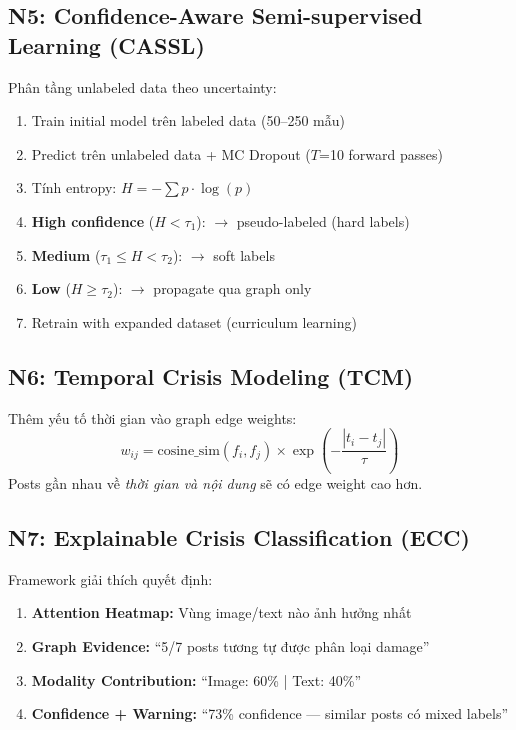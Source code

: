 \documentclass[12pt,a4paper]{article}
\begin{document}
\subsection{N5: Confidence-Aware Semi-supervised Learning (CASSL)}

Phân tầng unlabeled data theo uncertainty:
\begin{enumerate}
  \item Train initial model trên labeled data (50--250 mẫu)
  \item Predict trên unlabeled data + MC Dropout ($T$=10 forward passes)
  \item Tính entropy: $H = -\sum p \cdot \log(p)$
  \item \textbf{High confidence} ($H < \tau_1$): $\rightarrow$ pseudo-labeled (hard labels)
  \item \textbf{Medium} ($\tau_1 \leq H < \tau_2$): $\rightarrow$ soft labels
  \item \textbf{Low} ($H \geq \tau_2$): $\rightarrow$ propagate qua graph only
  \item Retrain with expanded dataset (curriculum learning)
\end{enumerate}

\subsection{N6: Temporal Crisis Modeling (TCM)}

Thêm yếu tố thời gian vào graph edge weights:
\begin{equation}
w_{ij} = \text{cosine\_sim}(f_i, f_j) \times \exp\left(-\frac{|t_i - t_j|}{\tau}\right)
\end{equation}
Posts gần nhau về \textit{thời gian và nội dung} sẽ có edge weight cao hơn.

\subsection{N7: Explainable Crisis Classification (ECC)}

Framework giải thích quyết định:
\begin{enumerate}
  \item \textbf{Attention Heatmap:} Vùng image/text nào ảnh hưởng nhất
  \item \textbf{Graph Evidence:} ``5/7 posts tương tự được phân loại damage''
  \item \textbf{Modality Contribution:} ``Image: 60\% | Text: 40\%''
  \item \textbf{Confidence + Warning:} ``73\% confidence — similar posts có mixed labels''
\end{enumerate}
\end{document}
